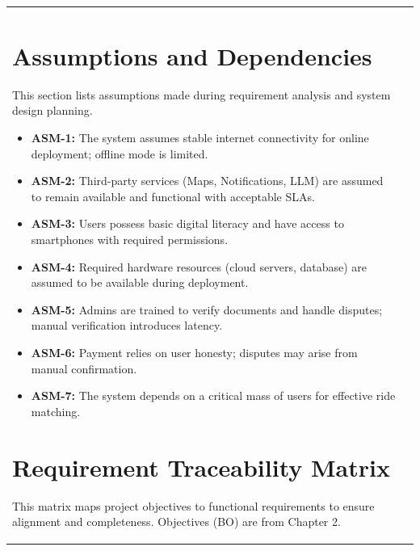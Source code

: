 \begin{longtable}{|>{\raggedright\arraybackslash}p{4cm}|>{\raggedright\arraybackslash}p{11cm}|}
\section{Assumptions and Dependencies}

This section lists assumptions made during requirement analysis and system design planning.

\begin{itemize}
\item \textbf{ASM-1:} The system assumes stable internet connectivity for online deployment; offline mode is limited.
\item \textbf{ASM-2:} Third-party services (Maps, Notifications, LLM) are assumed to remain available and functional with acceptable SLAs.
\item \textbf{ASM-3:} Users possess basic digital literacy and have access to smartphones with required permissions.
\item \textbf{ASM-4:} Required hardware resources (cloud servers, database) are assumed to be available during deployment.
\item \textbf{ASM-5:} Admins are trained to verify documents and handle disputes; manual verification introduces latency.
\item \textbf{ASM-6:} Payment relies on user honesty; disputes may arise from manual confirmation.
\item \textbf{ASM-7:} The system depends on a critical mass of users for effective ride matching.
\end{itemize}

\clearpage
\section{Requirement Traceability Matrix}

This matrix maps project objectives to functional requirements to ensure alignment and completeness. Objectives (BO) are from Chapter 2.


\end{longtable}
